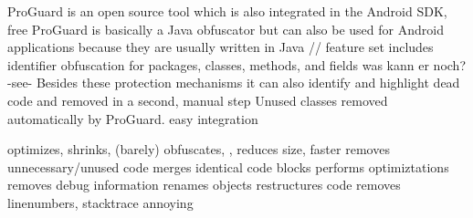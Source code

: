 ProGuard is an open source tool which is also integrated in the Android SDK, free
ProGuard is basically a Java obfuscator but can also be used for Android applications because they are usually written in Java // feature set includes identifier obfuscation for packages, classes, methods, and fields
was kann er noch? -see- Besides these protection mechanisms it can also
identify and highlight dead code and removed in a second, manual step
Unused classes removed automatically by ProGuard.
easy integration\cite{proguard}

optimizes, shrinks, (barely) obfuscates, , reduces size, faster
removes unnecessary/unused code
merges identical code blocks
performs optimiztations
removes debug information
renames objects
restructures code
removes linenumbers, stacktrace annoying
\cite{proguardLicensing}
\cite{strazzareLevel0}
